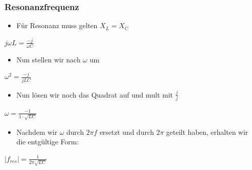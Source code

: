 \begin{frame}
\frametitle{Resonanzfrequenz}
\begin{itemize}
	\item Für Resonanz muss gelten $X_L = X_C$
\end{itemize}
\begin{LARGE}
\begin{center}
	$j \omega L = \frac{-j}{\omega C}$
\end{center}
\end{LARGE}
\begin{itemize}
	\item Nun stellen wir nach $\omega$ um
\end{itemize}
\begin{LARGE}
\begin{center}
	$\omega^2 = \frac{-j}{j L C}$
\end{center}
\end{LARGE}
\begin{itemize}
	\item	Nun lösen wir noch das Quadrat auf und mult mit $\frac{j}{j}$
\end{itemize}
\begin{LARGE}
\begin{center}
	$\omega = \frac{-1}{1 \cdot \sqrt{L C}}$
\end{center}
\end{LARGE}
\begin{itemize}
	\item	Nachdem wir $\omega$ durch $2 \pi f$ ersetzt und durch $2 \pi$ geteilt haben, erhalten wir die entgültige Form:
\end{itemize}
\begin{center}
	\LARGE{$ |f_{res}| = \frac{1}{2 \pi \sqrt{L C}} $}
\end{center}
\end{frame}

